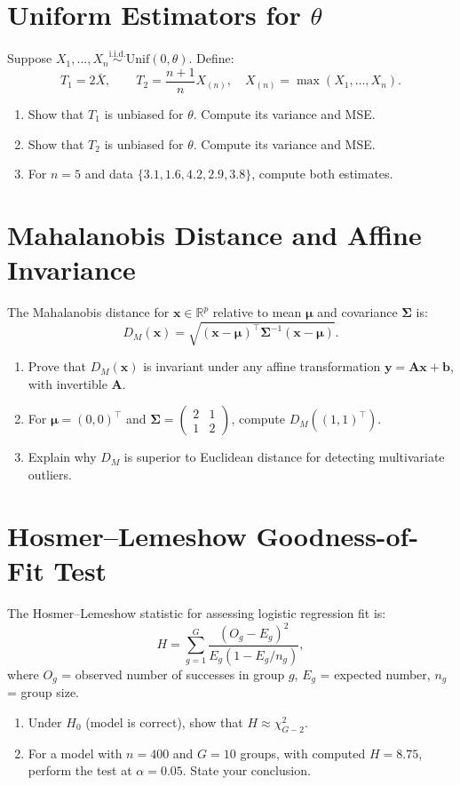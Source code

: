 \documentclass[12pt,a4paper]{article}
\begin{document}
\section{Uniform Estimators for \(\theta\)}
Suppose \( X_1,\ldots,X_n \stackrel{\mathrm{i.i.d.}}{\sim}\mathrm{Unif}(0,\theta) \).
Define:
\[
T_1=2\bar{X}, \qquad T_2=\frac{n+1}{n}X_{(n)}, \quad X_{(n)}=\max(X_1,\ldots,X_n).
\]
\begin{enumerate}[label=(\arabic*)]
\item Show that \( T_1 \) is unbiased for \( \theta \). Compute its variance and MSE.
\item Show that \( T_2 \) is unbiased for \( \theta \). Compute its variance and MSE.
\item For \( n=5 \) and data \( \{3.1,1.6,4.2,2.9,3.8\} \), compute both estimates.
\end{enumerate}

\section{Mahalanobis Distance and Affine Invariance}
The Mahalanobis distance for \( \mathbf{x}\in\mathbb{R}^p \) relative to mean \( \boldsymbol{\mu} \) and covariance \( \boldsymbol{\Sigma} \) is:
\[
D_M(\mathbf{x}) = \sqrt{(\mathbf{x}-\boldsymbol{\mu})^\top\boldsymbol{\Sigma}^{-1}(\mathbf{x}-\boldsymbol{\mu})}.
\]
\begin{enumerate}[label=(\arabic*)]
\item Prove that \( D_M(\mathbf{x}) \) is invariant under any affine transformation \( \mathbf{y}=\mathbf{A}\mathbf{x}+\mathbf{b} \), with invertible \( \mathbf{A} \).
\item For \( \boldsymbol{\mu}=(0,0)^\top \) and \( \boldsymbol{\Sigma}=\begin{pmatrix}2&1\\1&2\end{pmatrix} \), compute \( D_M((1,1)^\top) \).
\item Explain why \( D_M \) is superior to Euclidean distance for detecting multivariate outliers.
\end{enumerate}


\section{Hosmer–Lemeshow Goodness-of-Fit Test}
The Hosmer–Lemeshow statistic for assessing logistic regression fit is:
\[
H = \sum_{g=1}^{G} \frac{(O_g - E_g)^2}{E_g(1 - E_g/n_g)},
\]
where \( O_g \) = observed number of successes in group \( g \), \( E_g \) = expected number, \( n_g \) = group size.
\begin{enumerate}[label=(\arabic*)]
\item Under \( H_0 \) (model is correct), show that \( H \approx \chi^2_{G-2} \).
\item For a model with \( n=400 \) and \( G=10 \) groups, with computed \( H=8.75 \), perform the test at \( \alpha=0.05 \).
State your conclusion.
\end{enumerate}
\end{document}
